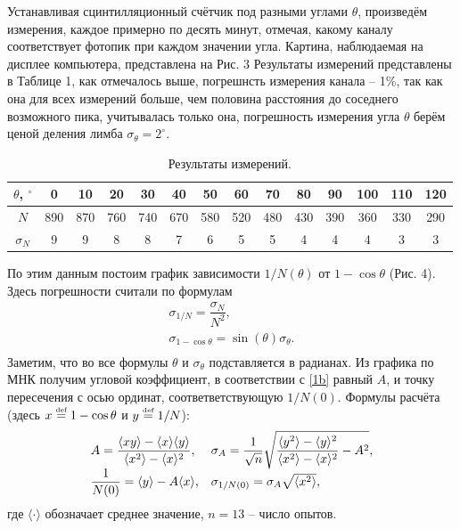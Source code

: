 \documentclass[a4paper,12pt]{article}
\theoremstyle{definition}
\newcommand{\eqdef}{\stackrel{\text{\tiny{def}}}{=}}
\begin{document}
Устанавливая сцинтилляционный счётчик под разными углами $\theta$, произведём измерения, каждое примерно по десять минут, отмечая, какому каналу соответствует фотопик при каждом значении угла. Картина, наблюдаемая на дисплее компьютера, представлена на Рис. 3
Результаты измерений представлены в Таблице 1, как отмечалось выше, погрешнсть измерения канала -- 1\%, так как она для всех измерений больше, чем половина расстояния до соседнего возможного пика, учитывалась только она, погрешность измерения угла $\theta$ берём ценой деления лимба $\sigma_\theta = 2^\circ$.
\begin{table}[h]
\begin{tabular}{|c|c|c|c|c|c|c|c|c|c|c|c|c|c|}
\hline
$\theta$, $^\circ$ & 0   & 10  & 20  & 30  & 40  & 50  & 60  & 70  & 80  & 90  & 100 & 110 & 120 \\ \hline
$N$                & 890 & 870 & 760 & 740 & 670 & 580 & 520 & 480 & 430 & 390 & 360 & 330 & 290 \\ \hline
$\sigma_N$         & 9   & 9   & 8   & 8   & 7   & 6   & 5   & 5   & 4   & 4   & 4   & 3   & 3   \\ \hline
\end{tabular}
\centering
\caption{Результаты измерений.}
\end{table}
По этим данным постоим график зависимости $1/N(\theta)$ от $1-\cos \theta$ (Рис. 4). Здесь погрешности считали по формулам
\[\begin{array}{l}
\sigma_{1/N} = \dfrac{\sigma_N}{N^2},\\
\sigma_{1-\cos \theta} = \sin(\theta) \sigma_\theta.\\
\end{array}\]
Заметим, что во все формулы $\theta$ и $\sigma_\theta$ подставляется в радианах. Из графика по МНК получим угловой коэффициент, в соответствии с \eqref{1b} равный $A$, и точку пересечения с осью ординат, соответветствующую $1/N(0)$. Формулы расчёта (здесь $x \eqdef 1 -\cos\theta$ и $y \eqdef 1/N$):
\[\begin{array}{l l}
A = \dfrac{\langle xy \rangle - \langle x \rangle \langle y \rangle}{\langle x^2 \rangle - \langle x \rangle^2}, & \sigma_A = \dfrac{1}{\sqrt{n}}\sqrt{\dfrac{\langle y^2 \rangle - \langle y \rangle^2}{\langle x^2 \rangle - \langle x \rangle^2} - A^2},\\
\dfrac{1}{N(0)} = \langle y \rangle - A \langle x \rangle, & \sigma_{1/N(0)} = \sigma_A \sqrt{\langle x^2\rangle},\\
\end{array}\]
где $\langle \cdot \rangle$ обозначает среднее значение, $n = 13$ -- число опытов.
\end{document}
